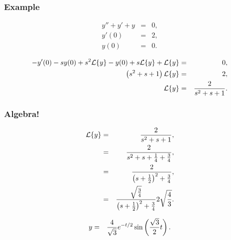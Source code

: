 \begin{frame}
  \frametitle{Example}

  \begin{eqnarray*}
    y''+y'+y & = & 0, \\
    y'(0) & = & 2, \\
    y(0) & = & 0.
  \end{eqnarray*}

  {
    \begin{eqnarray*}
      -y'(0) - sy(0) + s^2 \laplace{y} - y(0) + s \laplace{y} + \laplace{y} & = & 0, \\
      \lp s^2+s+1 \rp \laplace{y} & = & 2, \\
      \laplace{y} & = & \frac{2}{s^2+s+1}.
    \end{eqnarray*}
        
  }

\end{frame}


\begin{frame}
  \frametitle{Algebra!}

  \begin{eqnarray*}
    \laplace{y} & = & \frac{2}{s^2+s+1}, \\
    & = & \frac{2}{s^2+s+\frac{1}{4} + \frac{3}{4}}, \\
    & = & \frac{2}{\lp s + \half \rp^2 + \frac{3}{4}}, \\
    & = & \frac{\sqrt{\frac{3}{4}}}{\lp s + \half \rp^2 + \frac{3}{4}} 2 \sqrt{\frac{4}{3}}.
  \end{eqnarray*}

  {
    \begin{eqnarray*}
      y & = & \frac{4}{\sqrt{3}} e^{-t/2}\sin\left(\frac{\sqrt{3}}{2} t\right).
    \end{eqnarray*}
  }

\end{frame}


\begin{frame}
  \frametitle{}


\end{frame}


\begin{frame}
  \frametitle{}


\end{frame}




